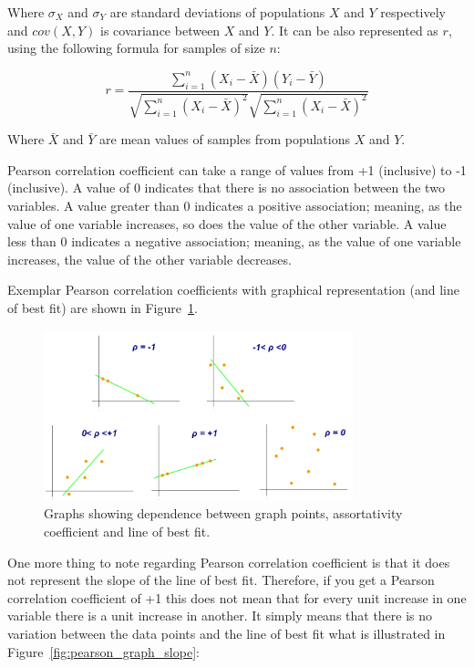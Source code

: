 Where $\sigma_X$ and $\sigma_Y$ are standard deviations of populations $X$ and $Y$ respectively and $cov(X,Y)$ is covariance between $X$ and $Y$.
It can be also represented as $r$, using the following formula for samples of size $n$:

$$r = \frac{\sum_{i=1}^{n} (X_i - \bar{X}) (Y_i - \bar{Y}) }
{ \sqrt{\sum_{i=1}^{n} (X_i - \bar{X})^2} \sqrt{\sum_{i=1}^{n} (X_i - \bar{X})^2} }$$

Where $\bar{X}$ and $\bar{Y}$ are mean values of samples from populations $X$ and $Y$.

Pearson correlation coefficient can take a range of values from +1 (inclusive) to -1 (inclusive).
A value of 0 indicates that there is no association between the two variables.
A value greater than 0 indicates a positive association; meaning, as the value of one variable increases, so does the value of the other variable.
A value less than 0 indicates a negative association; meaning, as the value of one variable increases, the value of the other variable decreases.

Exemplar Pearson correlation coefficients with graphical representation (and line of best fit) are shown in Figure~\ref{fig:pearson_graph}.

\begin{figure}[h!]
  \centering
  \captionsetup{justification=centering}
    \includegraphics[width=0.8\textwidth]{images/pearson_graphs.png}
  \caption{Graphs showing dependence between graph points, assortativity coefficient and line of best fit.\cite{wiki_pearson}}
  \label{fig:pearson_graph}
\end{figure}

One more thing to note regarding Pearson correlation coefficient is that it does not represent the slope of the line of best fit.
Therefore, if you get a Pearson correlation coefficient of +1 this does not mean that for every unit increase in one variable there is a unit increase in another.
It simply means that there is no variation between the data points and the line of best fit what is illustrated in Figure~\ref{fig:pearson_graph_slope}:

